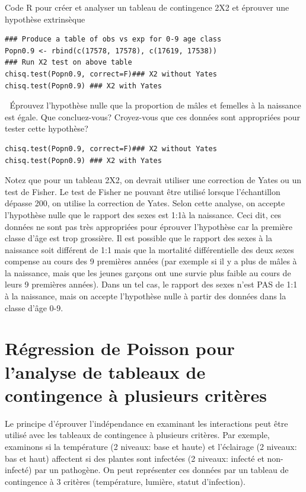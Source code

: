 \documentclass[12pt,]{book}
\begin{document}
Code R pour créer et analyser un tableau de contingence 2X2 et éprouver une hypothèse extrinsèque

\begin{verbatim}
### Produce a table of obs vs exp for 0-9 age class
Popn0.9 <- rbind(c(17578, 17578), c(17619, 17538))
### Run X2 test on above table
chisq.test(Popn0.9, correct=F)### X2 without Yates
chisq.test(Popn0.9) ### X2 with Yates
\end{verbatim}

 Éprouvez l'hypothèse nulle que la proportion de mâles et femelles à la
naissance est égale. Que concluez-vous? Croyez-vous que ces données
sont appropriées pour tester cette hypothèse?

\begin{verbatim}
chisq.test(Popn0.9, correct=F)### X2 without Yates
chisq.test(Popn0.9) ### X2 with Yates
\end{verbatim}

Notez que pour un tableau 2X2, on devrait utiliser une correction de
Yates ou un test de Fisher. Le test de Fisher ne pouvant être utilisé
lorsque l'échantillon dépasse 200, on utilise la correction de Yates.
Selon cette analyse, on accepte l'hypothèse nulle que le rapport des
sexes est 1:1à la naissance. Ceci dit, ces données ne sont pas très
appropriées pour éprouver l'hypothèse car la première classe d'âge est
trop grossière. Il est possible que le rapport des sexes à la naissance
soit différent de 1:1 mais que la mortalité différentielle des deux sexes
compense au cours des 9 premières années (par exemple si il y a plus
de mâles à la naissance, mais que les jeunes garçons ont une survie
plus faible au cours de leurs 9 premières années). Dans un tel cas, le
rapport des sexes n'est PAS de 1:1 à la naissance, mais on accepte
l'hypothèse nulle à partir des données dans la classe d'âge 0-9.

\hypertarget{ruxe9gression-de-poisson-pour-lanalyse-de-tableaux-de-contingence-uxe0-plusieurs-crituxe8res}{%
\section{Régression de Poisson pour l'analyse de tableaux de contingence à plusieurs critères}\label{ruxe9gression-de-poisson-pour-lanalyse-de-tableaux-de-contingence-uxe0-plusieurs-crituxe8res}}

Le principe d'éprouver l'indépendance en examinant les interactions
peut être utilisé avec les tableaux de contingence à plusieurs critères.
Par exemple, examinons si la température (2 niveaux: base et haute) et
l'éclairage (2 niveaux: bas et haut) affectent si des plantes sont
infectées (2 niveaux: infecté et non-infecté) par un pathogène. On
peut représenter ces données par un tableau de contingence à 3
critères (température, lumière, statut d'infection).
\end{document}
